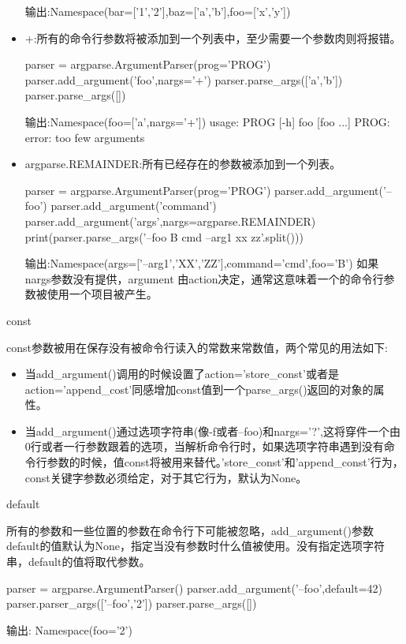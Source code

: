 \begin{itemize}
\begin{python}
\end{python}
输出:Namespace(bar=['1','2'],baz=['a','b'],foo=['x','y'])
\item +:所有的命令行参数将被添加到一个列表中，至少需要一个参数肉则将报错。
\begin{python}
parser = argparse.ArgumentParser(prog='PROG')
parser.add_argument('foo',nargs='+')
parser.parse_args(['a','b'])
parser.parse_args([])
\end{python}
输出:Namespace(foo=['a',nargs='+'])\newline
usage: PROG [-h] foo [foo ...]\newline
PROG: error: too few arguments\newline
\item argparse.REMAINDER:所有已经存在的参数被添加到一个列表。
\begin{python}
parser = argparse.ArgumentParser(prog='PROG')
parser.add_argument('--foo')
parser.add_argument('command')
parser.add_argument('args',nargs=argparse.REMAINDER)
print(parser.parse_args('--foo B cmd --arg1 xx zz'.split()))
\end{python}
输出:Namespace(args=['--arg1','XX','ZZ'],command='cmd',foo='B')
如果nargs参数没有提供，argument 由action决定，通常这意味着一个的命令行参数被使用一个项目被产生。
\end{itemize}
const\par
const参数被用在保存没有被命令行读入的常数来常数值，两个常见的用法如下:
\begin{itemize}
\item 当add\_argument()调用的时候设置了action='store\_const'或者是action='append\_cost'同感增加const值到一个parse\_args()返回的对象的属性。
\item 当add\_argument()通过选项字符串(像-f或者--foo)和nargs='?',这将穿件一个由0行或者一行参数跟着的选项，当解析命令行时，如果选项字符串遇到没有命令行参数的时候，值const将被用来替代。'store\_const'和'append\_const'行为，const关键字参数必须给定，对于其它行为，默认为None。
\end{itemize}
default\par
所有的参数和一些位置的参数在命令行下可能被忽略，add\_argument()参数default的值默认为None，指定当没有参数时什么值被使用。没有指定选项字符串，default的值将取代参数。
\begin{python}
parser = argparse.ArgumentParser()
parser.add_argument('--foo',default=42)
parser.parser_args(['--foo','2'])
parser.parse_args([])
\end{python}
输出:
Namespace(foo='2')\newline
